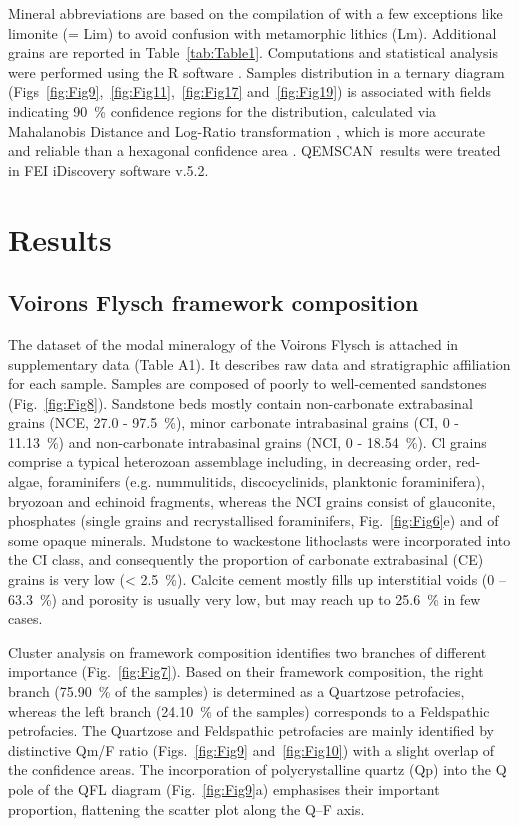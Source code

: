 \documentclass[twoside]{article}
\newcommand\registred{\textsuperscript{\tiny\textregistered}}
\begin{document}
Mineral abbreviations are based on the compilation of \cite{Whitney2010} with a few exceptions like limonite (= Lim) to avoid confusion with metamorphic lithics (Lm). Additional grains are reported in Table~\ref{tab:Table1}. Computations and statistical analysis were performed using the R software \citep{RCoreTeam2015}. Samples distribution in a ternary diagram (Figs~\ref{fig:Fig9},~\ref{fig:Fig11},~\ref{fig:Fig17} and~\ref{fig:Fig19}) is associated with fields indicating 90~\% confidence regions for the distribution, calculated via Mahalanobis Distance and Log-Ratio transformation \citep{Hamilton2016}, which is more accurate and reliable \citep{Weltje2002} than a hexagonal confidence area \citep{Ingersoll1978}. QEMSCAN\registred\ results were treated in FEI iDiscovery software v.5.2.

\section{Results}

\subsection{Voirons Flysch framework composition}

The dataset of the modal mineralogy of the Voirons Flysch is attached in supplementary data (Table A1). It describes raw data and stratigraphic affiliation for each sample. Samples are composed of poorly to well-cemented sandstones (Fig.~\ref{fig:Fig8}). Sandstone beds mostly contain non-carbonate extrabasinal grains (NCE, 27.0 - 97.5~\%), minor carbonate intrabasinal grains (CI, 0 - 11.13~\%) and non-carbonate intrabasinal grains (NCI, 0 - 18.54~\%). Cl grains comprise a typical heterozoan assemblage including, in decreasing order, red-algae, foraminifers (e.g. nummulitids, discocyclinids, planktonic foraminifera), bryozoan and echinoid fragments, whereas the NCI grains consist of glauconite, phosphates (single grains and recrystallised foraminifers, Fig.~\ref{fig:Fig6}e) and of some opaque minerals. Mudstone to wackestone lithoclasts were incorporated into the CI class, and consequently the proportion of carbonate extrabasinal (CE) grains is very low (< 2.5~\%). Calcite cement mostly fills up interstitial voids (0 – 63.3~\%) and porosity is usually very low, but may reach up to 25.6~\% in few cases.\par
\medskip
Cluster analysis on framework composition identifies two branches of different importance (Fig.~\ref{fig:Fig7}). Based on their framework composition, the right branch (75.90~\% of the samples) is determined as a Quartzose petrofacies, whereas the left branch (24.10~\% of the samples) corresponds to a Feldspathic petrofacies. The Quartzose and Feldspathic petrofacies are mainly identified by distinctive Qm/F ratio (Figs.~\ref{fig:Fig9} and~\ref{fig:Fig10}) with a slight overlap of the confidence areas. The incorporation of polycrystalline quartz (Qp) into the Q pole of the QFL diagram (Fig.~\ref{fig:Fig9}a) emphasises their important proportion, flattening the scatter plot along the Q–F axis.
\end{document}

